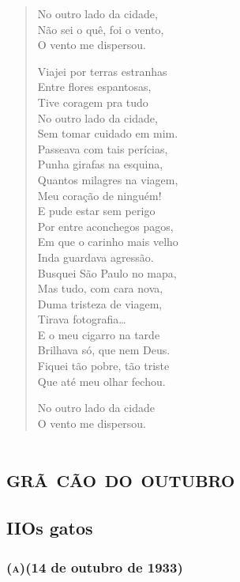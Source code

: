 
\begin{verse}
No outro lado da cidade,\\
Não sei o quê, foi o vento,\\
O vento me dispersou.

Viajei por terras estranhas\\
Entre flores espantosas,\\
Tive coragem pra tudo\\
No outro lado da cidade,\\
Sem tomar cuidado em mim.\\
Passeava com tais perícias,\\
Punha girafas na esquina,\\
Quantos milagres na viagem,\\
Meu coração de ninguém!\\
E pude estar sem perigo\\
Por entre aconchegos pagos,\\
Em que o carinho mais velho\\
Inda guardava agressão.\\
Busquei São Paulo no mapa,\\
Mas tudo, com cara nova,\\
Duma tristeza de viagem,\\
Tirava fotografia\ldots{}\\
E o meu cigarro na tarde\\
Brilhava só, que nem Deus.\\
Fiquei tão pobre, tão triste\\
Que até meu olhar fechou.

No outro lado da cidade\\
O vento me dispersou.
\end{verse}

\chapter[\textsc{grã cão do outubro}\\\textsc{ii}\ \ Os gatos]{\textsc{grã cão do outubro}}

\section*{II\break Os gatos}

\bigskip

\subsection{\textsc{(a)}\break (14 de outubro de 1933)}


